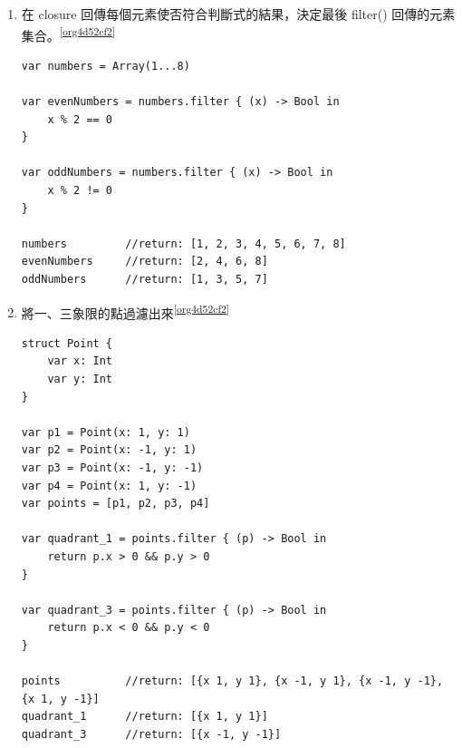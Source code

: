 \documentclass[a4paper,12pt]{article}
\begin{document}
\begin{enumerate}
\item 在 closure 回傳每個元素使否符合判斷式的結果，決定最後 filter() 回傳的元素集合。\textsuperscript{\ref{org4d52cf2}}
\label{sec:orgee3e6c9}
\lstset{breaklines=true,language=swift,label= ,caption= ,captionpos=b,firstnumber=1,numbers=left}
\begin{lstlisting}
var numbers = Array(1...8)

var evenNumbers = numbers.filter { (x) -> Bool in
    x % 2 == 0
}

var oddNumbers = numbers.filter { (x) -> Bool in
    x % 2 != 0
}

numbers         //return: [1, 2, 3, 4, 5, 6, 7, 8]
evenNumbers     //return: [2, 4, 6, 8]
oddNumbers      //return: [1, 3, 5, 7]

\end{lstlisting}
\item 將一、三象限的點過濾出來\textsuperscript{\ref{org4d52cf2}}
\label{sec:orgbd513df}
\lstset{breaklines=true,language=swift,label= ,caption= ,captionpos=b,firstnumber=1,numbers=left}
\begin{lstlisting}
struct Point {
    var x: Int
    var y: Int
}

var p1 = Point(x: 1, y: 1)
var p2 = Point(x: -1, y: 1)
var p3 = Point(x: -1, y: -1)
var p4 = Point(x: 1, y: -1)
var points = [p1, p2, p3, p4]

var quadrant_1 = points.filter { (p) -> Bool in
    return p.x > 0 && p.y > 0
}

var quadrant_3 = points.filter { (p) -> Bool in
    return p.x < 0 && p.y < 0
}

points          //return: [{x 1, y 1}, {x -1, y 1}, {x -1, y -1}, {x 1, y -1}]
quadrant_1      //return: [{x 1, y 1}]
quadrant_3      //return: [{x -1, y -1}]

\end{lstlisting}
\end{enumerate}
\end{document}
